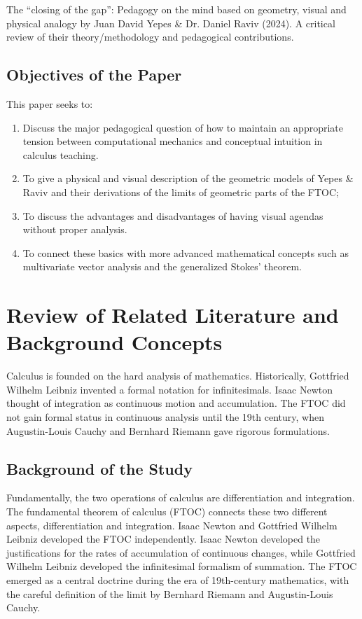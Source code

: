 \documentclass[11pt, a4paper]{article}
\begin{document}
The ``closing of the gap'': Pedagogy on the mind based on geometry, visual and physical analogy by Juan David Yepes \& Dr. Daniel Raviv (2024). A critical review of their theory/methodology and pedagogical contributions.

\subsection{Objectives of the Paper}
\label{subsec:objectives}
This paper seeks to:
\begin{enumerate}
    \item Discuss the major pedagogical question of how to maintain an appropriate tension between computational mechanics and conceptual intuition in calculus teaching.
    \item To give a physical and visual description of the geometric models of Yepes \& Raviv and their derivations of the limits of geometric parts of the FTOC;
    \item To discuss the advantages and disadvantages of having visual agendas without proper analysis.
    \item To connect these basics with more advanced mathematical concepts such as multivariate vector analysis and the generalized Stokes' theorem.
\end{enumerate}

\section{Review of Related Literature and Background Concepts}
\label{sec:literature}
Calculus is founded on the hard analysis of mathematics. Historically, Gottfried Wilhelm Leibniz invented a formal notation for infinitesimals. Isaac Newton thought of integration as continuous motion and accumulation. The FTOC did not gain formal status in continuous analysis until the 19th century, when Augustin-Louis Cauchy and Bernhard Riemann gave rigorous formulations.

\subsection{Background of the Study}
\label{subsec:background}
Fundamentally, the two operations of calculus are differentiation and integration. The fundamental theorem of calculus (FTOC) connects these two different aspects, differentiation and integration. Isaac Newton and Gottfried Wilhelm Leibniz developed the FTOC independently. Isaac Newton developed the justifications for the rates of accumulation of continuous changes, while Gottfried Wilhelm Leibniz developed the infinitesimal formalism of summation. The FTOC emerged as a central doctrine during the era of 19th-century mathematics, with the careful definition of the limit by Bernhard Riemann and Augustin-Louis Cauchy.
\end{document}

